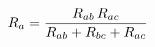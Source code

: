 \documentclass[preview]{standalone}
\begin{document}
\begin{align*}
\special{dvisvgm:raw <g id='unique000'>}R_a = \frac{R_{ab}\,R_{ac}}{R_{ab} + R_{bc} + R_{ac}}\special{dvisvgm:raw </g>}
\end{align*}
\end{document}

